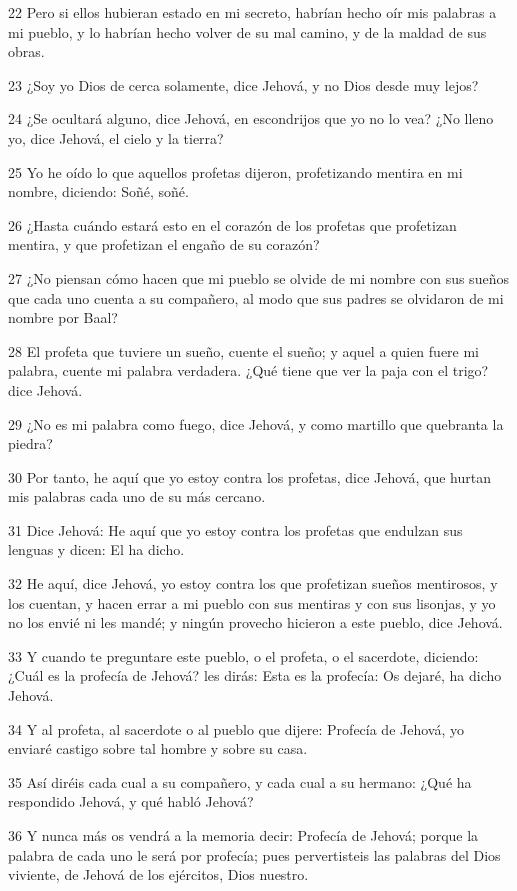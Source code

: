 \par 22 Pero si ellos hubieran estado en mi secreto, habrían hecho oír mis palabras a mi pueblo, y lo habrían hecho volver de su mal camino, y de la maldad de sus obras.
\par 23 ¿Soy yo Dios de cerca solamente, dice Jehová, y no Dios desde muy lejos?
\par 24 ¿Se ocultará alguno, dice Jehová, en escondrijos que yo no lo vea? ¿No lleno yo, dice Jehová, el cielo y la tierra?
\par 25 Yo he oído lo que aquellos profetas dijeron, profetizando mentira en mi nombre, diciendo: Soñé, soñé.
\par 26 ¿Hasta cuándo estará esto en el corazón de los profetas que profetizan mentira, y que profetizan el engaño de su corazón?
\par 27 ¿No piensan cómo hacen que mi pueblo se olvide de mi nombre con sus sueños que cada uno cuenta a su compañero, al modo que sus padres se olvidaron de mi nombre por Baal?
\par 28 El profeta que tuviere un sueño, cuente el sueño; y aquel a quien fuere mi palabra, cuente mi palabra verdadera. ¿Qué tiene que ver la paja con el trigo? dice Jehová.
\par 29 ¿No es mi palabra como fuego, dice Jehová, y como martillo que quebranta la piedra?
\par 30 Por tanto, he aquí que yo estoy contra los profetas, dice Jehová, que hurtan mis palabras cada uno de su más cercano.
\par 31 Dice Jehová: He aquí que yo estoy contra los profetas que endulzan sus lenguas y dicen: El ha dicho.
\par 32 He aquí, dice Jehová, yo estoy contra los que profetizan sueños mentirosos, y los cuentan, y hacen errar a mi pueblo con sus mentiras y con sus lisonjas, y yo no los envié ni les mandé; y ningún provecho hicieron a este pueblo, dice Jehová.
\par 33 Y cuando te preguntare este pueblo, o el profeta, o el sacerdote, diciendo: ¿Cuál es la profecía de Jehová? les dirás: Esta es la profecía: Os dejaré, ha dicho Jehová.
\par 34 Y al profeta, al sacerdote o al pueblo que dijere: Profecía de Jehová, yo enviaré castigo sobre tal hombre y sobre su casa.
\par 35 Así diréis cada cual a su compañero, y cada cual a su hermano: ¿Qué ha respondido Jehová, y qué habló Jehová?
\par 36 Y nunca más os vendrá a la memoria decir: Profecía de Jehová; porque la palabra de cada uno le será por profecía; pues pervertisteis las palabras del Dios viviente, de Jehová de los ejércitos, Dios nuestro.
